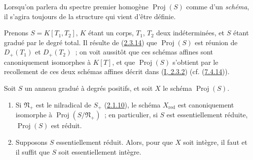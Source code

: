 Lorsqu'on parlera du spectre premier homogène $\operatorname{Proj}(S)$ comme
d'un \emph{schéma}, il s'agira toujours de la structure qui vient d'être
définie.

\begin{example}[2.4.3]
\label{II.2.4.3-fr}
Prenons $S=K[T_1,T_2]$, $K$ étant un corps, $T_1$, $T_2$ deux
indéterminées, et $S$ étant gradué par le degré total. Il résulte de
(\hyperref[II.2.3.14-fr]{2.3.14}) que $\operatorname{Proj}(S)$ est réunion
de $D_+(T_1)$ et $D_+(T_2)$~; on voit aussitôt que ces schémas affines sont
canoniquement isomorphes à $K[T]$, et que $\operatorname{Proj}(S)$
s'obtient par le recollement de ces deux schémas affines décrit dans
(\hyperref[I.2.3.2-fr]{I, 2.3.2}) (cf.
(\hyperref[II.7.4.14-fr]{7.4.14})).
\end{example}

\begin{proposition}[2.4.4]
\label{II.2.4.4-fr}
Soit $S$ un anneau gradué à degrés positifs, et soit $X$ le schéma
$\operatorname{Proj}(S)$.
\begin{enumerate}
  \item[\rm(i)] Si $\mathfrak{N}_+$ est le nilradical de $S_+$
    (\hyperref[II.2.1.10-fr]{2.1.10}), le schéma $X_{\mathrm{red}}$ est
    canoniquement isomorphe à $\operatorname{Proj}(S/\mathfrak{N}_+)$~; en
    particulier, si $S$ est essentiellement réduite,
    $\operatorname{Proj}(S)$ est réduit.
  \item[\rm(ii)] Supposons $S$ essentiellement réduit. Alors, pour que $X$
    soit intègre, il faut et il suffit que $S$ soit essentiellement intègre.
\end{enumerate}
\end{proposition}

